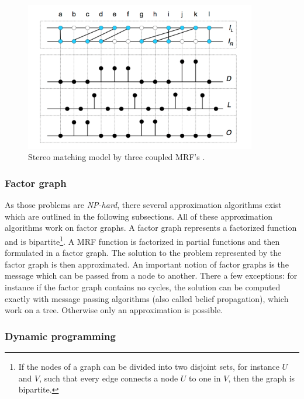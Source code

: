 \begin{figure}[h!]
  \centering
  \includegraphics[width=0.9\textwidth]{src/images/mrf-stereo-matching.png}
  \caption[Stereo matching model by three coupled MRF's]{Stereo matching model by three coupled MRF's \citep{sun2003stereo}.}
  \label{fig:mrf-stereo-matching}
\end{figure}

\subsubsection{Factor graph}

\noindent As those problems are \textit{NP-hard}, there several approximation algorithms exist which are outlined in the following subsections.
All of these approximation algorithms work on factor graphs.
A factor graph represents a factorized function and is bipartite\footnote{If the nodes of a graph can be divided into two disjoint sets, for instance $U$ and $V$, such that every edge connects a node $U$ to one in $V$, then the graph is bipartite.}.
A MRF function is factorized in partial functions and then formulated in a factor graph.
The solution to the problem represented by the factor graph is then approximated.
An important notion of factor graphs is the message which can be passed from a node to another.
There a few exceptions: for instance if the factor graph contains no cycles, the solution can be computed exactly with message passing algorithms (also called belief propagation), which work on a tree.
Otherwise only an approximation is possible.

\subsubsection{Dynamic programming}

